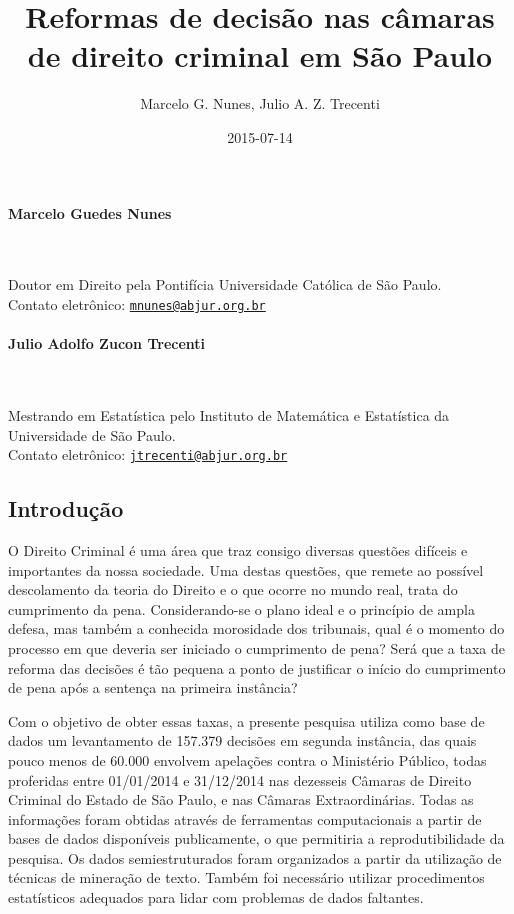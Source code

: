 \documentclass[10pt,]{article}
\title{\LARGE Reformas de decisão nas câmaras de direito criminal em São Paulo}
\author{Marcelo G. Nunes, Julio A. Z. Trecenti}
\date{2015-07-14}
\begin{document}
\maketitle


\paragraph{Marcelo Guedes Nunes}\label{marcelo-guedes-nunes}

~

Doutor em Direito pela Pontifícia Universidade Católica de São
Paulo.\\Contato eletrônico:
\href{mailto:mnunes@abjur.org.br}{\nolinkurl{mnunes@abjur.org.br}}

\paragraph{Julio Adolfo Zucon
Trecenti}\label{julio-adolfo-zucon-trecenti}

~

Mestrando em Estatística pelo Instituto de Matemática e Estatística da
Universidade de São Paulo.\\Contato eletrônico:
\href{mailto:jtrecenti@abjur.org.br}{\nolinkurl{jtrecenti@abjur.org.br}}

\subsection{Introdução}\label{introducao}

O Direito Criminal é uma área que traz consigo diversas questões
difíceis e importantes da nossa sociedade. Uma destas questões, que
remete ao possível descolamento da teoria do Direito e o que ocorre no
mundo real, trata do cumprimento da pena. Considerando-se o plano ideal
e o princípio de ampla defesa, mas também a conhecida morosidade dos
tribunais, qual é o momento do processo em que deveria ser iniciado o
cumprimento de pena? Será que a taxa de reforma das decisões é tão
pequena a ponto de justificar o início do cumprimento de pena após a
sentença na primeira instância?

Com o objetivo de obter essas taxas, a presente pesquisa utiliza como
base de dados um levantamento de 157.379 decisões em segunda instância,
das quais pouco menos de 60.000 envolvem apelações contra o Ministério
Público, todas proferidas entre 01/01/2014 e 31/12/2014 nas dezesseis
Câmaras de Direito Criminal do Estado de São Paulo, e nas Câmaras
Extraordinárias. Todas as informações foram obtidas através de
ferramentas computacionais a partir de bases de dados disponíveis
publicamente, o que permitiria a reprodutibilidade da pesquisa. Os dados
semiestruturados foram organizados a partir da utilização de técnicas de
mineração de texto. Também foi necessário utilizar procedimentos
estatísticos adequados para lidar com problemas de dados faltantes.
\end{document}
